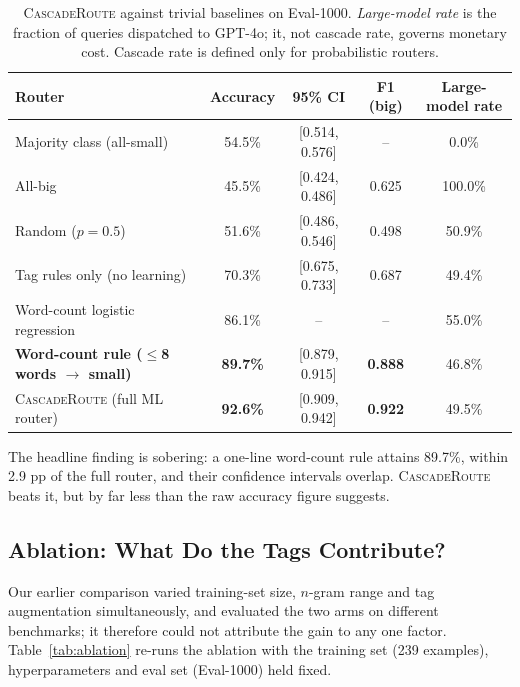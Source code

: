 \documentclass{article}
\newcommand{\system}{\textsc{CascadeRoute}}
\newcommand{\largemdl}{GPT-4o}
\begin{document}
\begin{table}[t]
\caption{\system{} against trivial baselines on Eval-1000. \emph{Large-model
rate} is the fraction of queries dispatched to \largemdl{}; it, not cascade
rate, governs monetary cost. Cascade rate is defined only for probabilistic
routers.}
\label{tab:baselines}
\centering
\small
\begin{tabular}{lcccc}
\toprule
\textbf{Router} & \textbf{Accuracy} & \textbf{95\% CI} & \textbf{F1 (big)} & \textbf{Large-model rate} \\
\midrule
Majority class (all-small)          & 54.5\% & [0.514, 0.576] & --    & 0.0\%   \\
All-big                             & 45.5\% & [0.424, 0.486] & 0.625 & 100.0\% \\
Random ($p{=}0.5$)                  & 51.6\% & [0.486, 0.546] & 0.498 & 50.9\%  \\
Tag rules only (no learning)        & 70.3\% & [0.675, 0.733] & 0.687 & 49.4\%  \\
Word-count logistic regression      & 86.1\% & --             & --    & 55.0\%  \\
\textbf{Word-count rule ($\leq$8 words $\to$ small)} & \textbf{89.7\%} & [0.879, 0.915] & \textbf{0.888} & 46.8\% \\
\midrule
\system{} (full ML router)          & \textbf{92.6\%} & [0.909, 0.942] & \textbf{0.922} & 49.5\% \\
\bottomrule
\end{tabular}
\end{table}

The headline finding is sobering: a one-line word-count rule attains 89.7\%,
within 2.9 pp of the full router, and their confidence intervals overlap.
\system{} beats it, but by far less than the raw accuracy figure suggests.

\subsection{Ablation: What Do the Tags Contribute?}
\label{sec:ablation}

Our earlier comparison varied training-set size, $n$-gram range and tag
augmentation simultaneously, and evaluated the two arms on different benchmarks;
it therefore could not attribute the gain to any one factor. Table~\ref{tab:ablation}
re-runs the ablation with the training set (239 examples), hyperparameters and
eval set (Eval-1000) held fixed.
\end{document}
